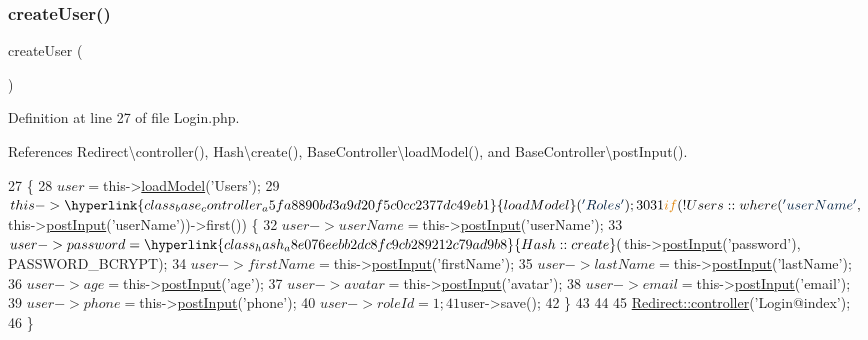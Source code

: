 \subsubsection{\texorpdfstring{create\+User()}{createUser()}}
{\footnotesize\ttfamily create\+User (\begin{DoxyParamCaption}{ }\end{DoxyParamCaption})}



Definition at line 27 of file Login.\+php.



References Redirect\textbackslash{}controller(), Hash\textbackslash{}create(), Base\+Controller\textbackslash{}load\+Model(), and Base\+Controller\textbackslash{}post\+Input().


\begin{DoxyCode}
27                                  \{
28         $user = $this->\hyperlink{class_base_controller_a5fa8890bd3a9d20f5c0cc2377dc49eb1}{loadModel}(\textcolor{stringliteral}{'Users'});
29         $this->\hyperlink{class_base_controller_a5fa8890bd3a9d20f5c0cc2377dc49eb1}{loadModel}(\textcolor{stringliteral}{'Roles'});
30 
31         \textcolor{keywordflow}{if} (!Users::where(\textcolor{stringliteral}{'userName'}, $this->\hyperlink{class_base_controller_a170629218b28c1759a89c4978b9323b3}{postInput}(\textcolor{stringliteral}{'userName'}))->first()) \{
32             $user->userName = $this->\hyperlink{class_base_controller_a170629218b28c1759a89c4978b9323b3}{postInput}(\textcolor{stringliteral}{'userName'});
33             $user->password = \hyperlink{class_hash_a8e076eebb2dc8fc9cb289212c79ad9b8}{Hash::create}($this->\hyperlink{class_base_controller_a170629218b28c1759a89c4978b9323b3}{postInput}(\textcolor{stringliteral}{'password'}), 
      PASSWORD\_BCRYPT);
34             $user->firstName = $this->\hyperlink{class_base_controller_a170629218b28c1759a89c4978b9323b3}{postInput}(\textcolor{stringliteral}{'firstName'});
35             $user->lastName = $this->\hyperlink{class_base_controller_a170629218b28c1759a89c4978b9323b3}{postInput}(\textcolor{stringliteral}{'lastName'});
36             $user->age = $this->\hyperlink{class_base_controller_a170629218b28c1759a89c4978b9323b3}{postInput}(\textcolor{stringliteral}{'age'});
37             $user->avatar = $this->\hyperlink{class_base_controller_a170629218b28c1759a89c4978b9323b3}{postInput}(\textcolor{stringliteral}{'avatar'});
38             $user->email = $this->\hyperlink{class_base_controller_a170629218b28c1759a89c4978b9323b3}{postInput}(\textcolor{stringliteral}{'email'});
39             $user->phone = $this->\hyperlink{class_base_controller_a170629218b28c1759a89c4978b9323b3}{postInput}(\textcolor{stringliteral}{'phone'});
40             $user->roleId = 1;
41             $user->save();
42         \}
43 
44 
45         \hyperlink{class_redirect_ab7d0d268b6aaa9a5470b7cb8c7eb1b61}{Redirect::controller}(\textcolor{stringliteral}{'Login@index'});
46     \}
\end{DoxyCode}
\hypertarget{class_login_a2ee0222a0eb00f2530a3281462ca0e46}{}\label{class_login_a2ee0222a0eb00f2530a3281462ca0e46} 

